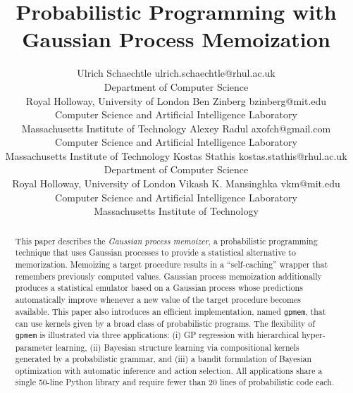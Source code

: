 \documentclass[twoside,11pt]{article}
\begin{document}
\title{Probabilistic Programming with Gaussian Process Memoization}


\author{\name Ulrich Schaechtle \email ulrich.schaechtle@rhul.ac.uk \\
	      \addr Department of Computer Science\\
              Royal Holloway, University of London
       \AND \name Ben Zinberg \email bzinberg@mit.edu \\
              \addr Computer Science and Artificial Intelligence Laboratory\\
              Massachusetts Institute of Technology
       \AND \name Alexey Radul \email axofch@gmail.com \\
              \addr Computer Science and Artificial Intelligence Laboratory\\
              Massachusetts Institute of Technology
       \AND \name Kostas Stathis \email kostas.stathis@rhul.ac.uk\\
              \addr Department of Computer Science\\
       Royal Holloway, University of London
       \AND \name Vikash K. Mansinghka \email vkm@mit.edu \\
	      \addr Computer Science and Artificial Intelligence Laboratory\\
	      Massachusetts Institute of Technology
} 


\maketitle


\begin{abstract}
This paper describes the {\em Gaussian process memoizer}, a probabilistic programming technique that uses Gaussian processes to provide a statistical alternative to memorization. Memoizing a target procedure results in a “self-caching” wrapper that remembers previously computed values. Gaussian process memoization additionally produces a statistical emulator based on a Gaussian process whose predictions automatically improve whenever a new value of the target procedure becomes available. This paper also introduces  an efficient implementation, named {\tt gpmem}, that can use kernels given by a broad class of probabilistic programs. The flexibility of {\tt gpmem} is illustrated via three applications: (i) GP regression with hierarchical hyper-parameter learning, (ii) Bayesian structure learning via compositional kernels generated by a probabilistic grammar, and (iii) a bandit formulation of Bayesian optimization with automatic inference and action selection. All applications share a single 50-line Python library and require fewer than 20 lines of probabilistic code each.
\end{abstract}
\end{document}
